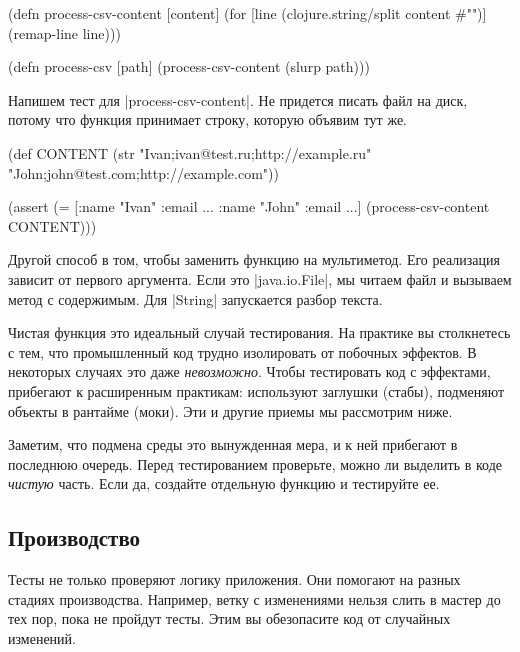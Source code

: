 \begin{english}
  \begin{clojure}
(defn process-csv-content [content]
  (for [line (clojure.string/split content #"\n")]
    (remap-line line)))

(defn process-csv [path]
  (process-csv-content (slurp path)))
  \end{clojure}
\end{english}

Напишем тест для \spverb|process-csv-content|. Не придется писать файл на диск,
потому что функция принимает строку, которую объявим тут же.

\begin{english}
  \begin{clojure}
(def CONTENT
  (str "Ivan;ivan@test.ru;http://example.ru"
       \newline
       "John;john@test.com;http://example.com"))

(assert (= [{:name "Ivan" :email ...}
            {:name "John" :email ...}]
           (process-csv-content CONTENT)))
  \end{clojure}
\end{english}

Другой способ в том, чтобы заменить функцию на мультиметод. Его реализация
зависит от первого аргумента. Если это \spverb|java.io.File|, мы читаем файл и
вызываем метод с содержимым. Для \spverb|String| запускается разбор текста.

Чистая функция это идеальный случай тестирования. На практике вы столкнетесь с
тем, что промышленный код трудно изолировать от побочных эффектов. В некоторых
случаях это даже \emph{невозможно}. Чтобы тестировать код с эффектами, прибегают
к расширенным практикам: используют заглушки (стабы), подменяют объекты в
рантайме (моки). Эти и другие приемы мы рассмотрим ниже.

Заметим, что подмена среды это вынужденная мера, и к ней прибегают в последнюю
очередь. Перед тестированием проверьте, можно ли выделить в коде \emph{чистую}
часть. Если да, создайте отдельную функцию и тестируйте ее.

\subsection{Производство}

Тесты не только проверяют логику приложения. Они помогают на разных стадиях
производства. Например, ветку с изменениями нельзя слить в мастер до тех пор,
пока не пройдут тесты. Этим вы обезопасите код от случайных изменений.

